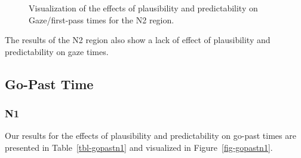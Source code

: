 \documentclass[
  letterpaper,
  DIV=11,
  numbers=noendperiod,
  nottoc,
  oneside]{scrreprt}
\begin{document}
\begin{figure}


\caption{\label{fig-gazen2}Visualization of the effects of plausibility
and predictability on Gaze/first-pass times for the N2 region.}

\end{figure}%

The results of the N2 region also show a lack of effect of plausibility
and predictability on gaze times.

\subsection{Go-Past Time}\label{go-past-time}

\subsubsection{N1}\label{n1-2}

Our results for the effects of plausibility and predictability on
go-past times are presented in Table~\ref{tbl-gopastn1} and visualized
in Figure~\ref{fig-gopastn1}.
\end{document}
